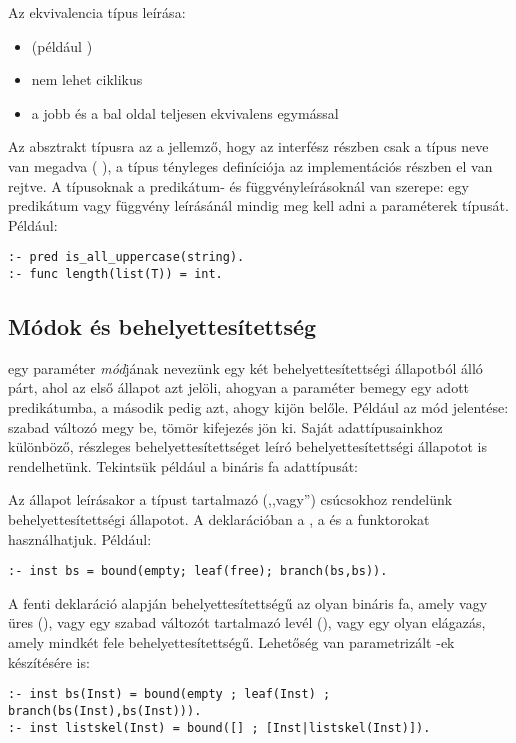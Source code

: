 Az ekvivalencia típus leírása:

\begin{itemize}
\item {}  \cd{==}  (például
)
\item nem lehet ciklikus
\item a jobb és a bal oldal teljesen ekvivalens egymással
\end{itemize}

Az absztrakt típusra az a jellemző, hogy az interfész részben csak a típus neve
van megadva ( ), a típus tényleges definíciója az
implementációs részben el van rejtve.
\br
A típusoknak a predikátum- és függvényleírásoknál van szerepe: egy predikátum
vagy függvény leírásánál mindig meg kell adni a paraméterek típusát. Például:

\begin{verbatim}
:- pred is_all_uppercase(string).
:- func length(list(T)) = int.
\end{verbatim}

\subsection{Módok és behelyettesítettség}

 egy paraméter \emph{mód}jának nevezünk egy két behelyettesítettségi állapotból
álló párt, ahol az első állapot azt jelöli, ahogyan a paraméter bemegy egy adott
predikátumba, a második pedig azt, ahogy kijön belőle. Például az  mód jelentése:
szabad változó megy be, tömör kifejezés jön ki.
\br
Saját adattípusainkhoz különböző, részleges behelyettesítettséget leíró behelyettesítettségi
állapotot is rendelhetünk. Tekintsük például a bináris fa adattípusát:


Az állapot leírásakor a típust tartalmazó (,,vagy'') csúcsokhoz rendelünk
behelyettesítettségi állapotot. A deklarációban a , a  és a
 funktorokat használhatjuk. Például:
\begin{verbatim}
:- inst bs = bound(empty; leaf(free); branch(bs,bs)).
\end{verbatim}
A fenti deklaráció alapján  behelyettesítettségű az olyan bináris fa, amely
vagy üres (), vagy egy szabad változót tartalmazó levél (),
vagy egy olyan elágazás, amely mindkét fele  behelyettesítettségű. Lehetőség
van parametrizált -ek készítésére is:
\begin{verbatim}
:- inst bs(Inst) = bound(empty ; leaf(Inst) ; branch(bs(Inst),bs(Inst))).
:- inst listskel(Inst) = bound([] ; [Inst|listskel(Inst)]).
\end{verbatim}

